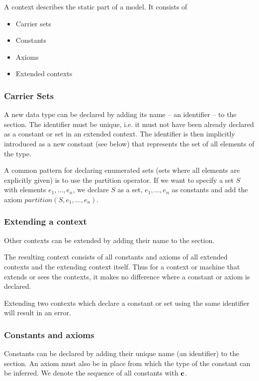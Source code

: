 A context describes the static part of a model. It consists of
\begin{itemize}
\item Carrier sets
\item Constants
\item Axioms
\item Extended contexts
\end{itemize}

\subsubsection{Carrier Sets}
\label{carrier_sets}
A new data type can be declared by adding its name -- an identifier -- to the  section.
The identifier must be unique, i.e. it must not have been already declared as a constant or set in an extended context.
The identifier is then implicitly introduced as a new constant (see below) that represents the set of all elements of the type. 

A common pattern for declaring enumerated sets (sets where all elements are explicitly given)
is to use the partition operator. If we want to specify a set $S$ with elements $e_1,\ldots,e_n$,
we declare $S$ as a set, $e_1,\ldots,e_n$ as constants and add the axiom $partition(S,e_1,\ldots,e_n)$.

\subsubsection{Extending a context}
Other contexts can be extended by adding their name to the  section.

The resulting context consists of all constants and axioms of all extended contexts and the extending context itself.
Thus for a context or machine that extends or sees the contexts, it makes no difference where a constant or axiom is declared.

Extending two contexts which declare a constant or set using the same identifier will result in an error.

\subsubsection{Constants and axioms}
\label{constants_and_axioms}
Constants can be declared by adding their unique name (an identifier) to the  section.
An axiom must also be in place from which the type of the constant can be inferred.
We denote the sequence of all constants with $\mathbf{c}$.

